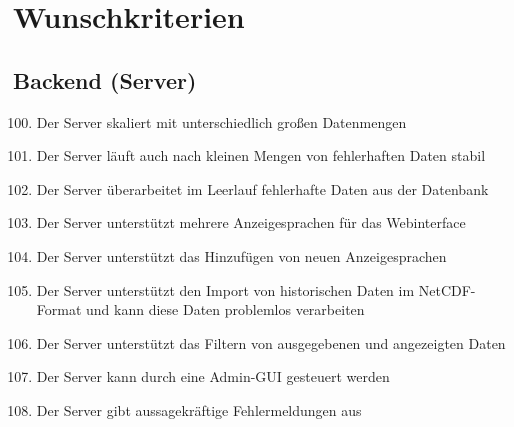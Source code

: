 \section{Wunschkriterien}
\subsection{Backend (Server)}
\begin{enumerate}[label=\textbf{WK\arabic{enumi}0}]
	\setcounter{enumi}{99}
	\item Der Server skaliert mit unterschiedlich großen Datenmengen
	\item Der Server läuft auch nach kleinen Mengen von fehlerhaften Daten stabil
	\item Der Server überarbeitet im Leerlauf fehlerhafte Daten aus der Datenbank
	\item Der Server unterstützt mehrere Anzeigesprachen für das Webinterface
	\item Der Server unterstützt das Hinzufügen von neuen Anzeigesprachen
	\item Der Server unterstützt den Import von historischen Daten im NetCDF-Format und kann diese Daten problemlos verarbeiten
	\item Der Server unterstützt das Filtern von ausgegebenen und angezeigten Daten
	\item Der Server kann durch eine Admin-GUI gesteuert werden
	\item Der Server gibt aussagekräftige Fehlermeldungen aus
\end{enumerate}
